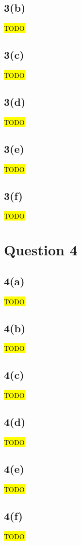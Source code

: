 \documentclass[12pt, a4paper,reqno]{article}
\begin{document}
\subsection*{3(b)}
\hl{TODO}

\subsection*{3(c)}
\hl{TODO}

\subsection*{3(d)}
\hl{TODO}

\subsection*{3(e)}
\hl{TODO}

\subsection*{3(f)}
\hl{TODO}


%
%
\clearpage\section*{Question 4}

\subsection*{4(a)}
\hl{TODO}

\subsection*{4(b)}
\hl{TODO}

\subsection*{4(c)}
\hl{TODO}

\subsection*{4(d)}
\hl{TODO}

\subsection*{4(e)}
\hl{TODO}

\subsection*{4(f)}
\hl{TODO}
\end{document}
